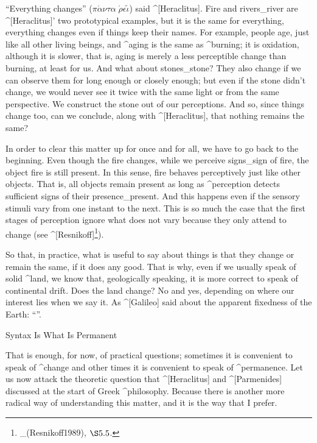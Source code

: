 ``Everything changes''
 ($\pi\acute\alpha\nu\tau\alpha \; \acute\rho\epsilon\tilde\iota$)
said ^[Heraclitus]. Fire and rivers_{river} are ^[Heraclitus]' two
prototypical examples, but it is the same for everything, everything
changes even if things keep their names. For example, people age, just
like all other living beings, and ^{aging} is the same as ^{burning}; it
is oxidation, although it is slower, that is, aging is merely a less
perceptible change than burning, at least for us. And what about
stones_{stone}?  They also change if we can observe them for long enough
or closely enough; but even if the stone didn't change, we would never
see it twice with the same light or from the same perspective. We
construct the stone out of our perceptions. And so, since things change
too, can we conclude, along with ^[Heraclitus], that nothing remains the
same?

In order to clear this matter up for once and for all, we have to go
back to the beginning. Even though the fire changes, while we perceive
signs_{sign} of fire, the object fire is still present. In this sense,
fire behaves perceptively just like other objects. That is, all objects
remain present as long as ^{perception} detects sufficient signs of
their presence_{present}. And this happens even if the sensory stimuli
vary from one instant to the next. This is so much the case that the
first stages of perception ignore what does not vary because they only
attend to change (see ^[Resnikoff]\footnote{_(Resnikoff1989),
$\S5.5$.}).

So that, in practice, what is useful to say about things is that they
change or remain the same, if it does any good. That is why, even if we
usually speak of solid ^{land}, we know that, geologically speaking, it
is more correct to speak of continental drift. Does the land change? No
and yes, depending on where our interest lies when we say it. As
^[Galileo] said about the apparent fixedness of the Earth:
``''.


\Section Syntax Is What Is Permanent

That is enough, for now, of practical questions; sometimes it is
convenient to speak of ^{change} and other times it is convenient to
speak of ^{permanence}. Let us now attack the theoretic question that
^[Heraclitus] and ^[Parmenides] discussed at the start of Greek
^{philosophy}. Because there is another more radical way of
understanding this matter, and it is the way that I prefer.


